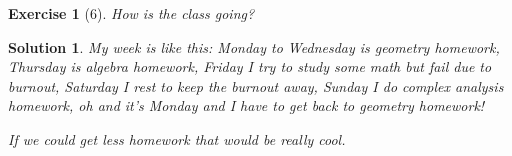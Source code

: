 \documentclass{article}
\theoremstyle{plain}
\newtheorem*{ex}{Exercise}
\theoremstyle{nonumberplain}
\newtheorem{sol}{Solution}
\begin{document}
\begin{ex}[6]
How is the class going?
\end{ex}

\begin{sol}
\frownie

\medskip

My week is like this: Monday to Wednesday is geometry homework, Thursday is algebra homework, Friday I try to study some math but fail due to burnout, Saturday I rest to keep the burnout away, Sunday I do complex analysis homework, oh and it's Monday and I have to get back to geometry homework!

If we could get less homework that would be really cool.
\end{sol}
\end{document}
